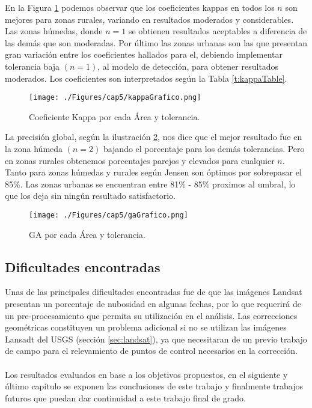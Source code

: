 En la Figura \ref{fig:kappaGrafico} podemos observar que los coeficientes kappas en todos los $ n  $ son mejores para zonas rurales, variando en resultados moderados y considerables. Las zonas h\'umedas, donde $ n=1 $ se obtienen resultados aceptables a diferencia de las dem\'as que son moderadas. Por \'ultimo las zonas urbanas son las que presentan gran variaci\'on entre los coeficientes hallados para el, debiendo implementar tolerancia baja $(n=1)$, al modelo de detecci\'on, para obtener resultados moderados. Los coeficientes son interpretados seg\'un la Tabla \ref{t:kappaTable}.
\begin{figure}[H]
	\centering
	\texttt{[image: ./Figures/cap5/kappaGrafico.png]}
	\caption{Coeficiente Kappa por cada \'Area y tolerancia.}
	\label{fig:kappaGrafico}
\end{figure}
La precisi\'on global, seg\'un la ilustraci\'on \ref{fig:gaGrafico}, nos dice que el mejor resultado fue en la zona h\'umeda $ (n=2) $ bajando el porcentaje para los dem\'as tolerancias. Pero en zonas rurales obtenemos porcentajes parejos y elevados para cualquier $ n $. Tanto para zonas h\'umedas y rurales seg\'un Jensen \cite{jensen1981urban} son \'optimos por sobrepasar el 85\%. Las zonas urbanas se encuentran entre 81\% - 85\% proximos al umbral, lo que los deja sin ning\'un resultado satisfactorio.
\begin{figure}[H]
	\centering
	\texttt{[image: ./Figures/cap5/gaGrafico.png]}
	\caption{GA por cada \'Area y tolerancia.}
	\label{fig:gaGrafico}
\end{figure}
\subsection{Dificultades encontradas} 
Unas de las principales dificultades encontradas fue de que las im\'agenes Landsat presentan un porcentaje de nubosidad en algunas fechas, por lo que requerir\'a de un pre-procesamiento que permita su utilizaci\'on en el an\'alisis. Las correcciones geom\'etricas constituyen un problema adicional si no se utilizan las im\'agenes Lansadt del USGS (secci\'on \ref{sec:landsat}), ya que necesitaran de un previo trabajo de campo para el relevamiento de puntos de control necesarios en la correcci\'on.\\~\\
Los resultados evaluados en base a los objetivos propuestos, en el siguiente y \'ultimo cap\'itulo se exponen las conclusiones de este trabajo  y finalmente trabajos futuros que puedan dar continuidad a este trabajo final de grado.
